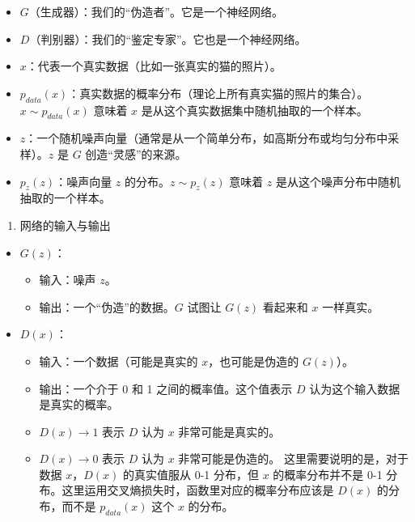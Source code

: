 \begin{itemize}
\tightlist
\item
  \(G\)（生成器）：我们的``伪造者''。它是一个神经网络。
\item
  \(D\)（判别器）：我们的``鉴定专家''。它也是一个神经网络。
\item
  \(x\)：代表一个真实数据（比如一张真实的猫的照片）。
\item
  \(p_{data}(x)\)：真实数据的概率分布（理论上所有真实猫的照片的集合）。\(x \sim p_{data}(x)\) 意味着 \(x\) 是从这个真实数据集中随机抽取的一个样本。
\item
  \(z\)：一个随机噪声向量（通常是从一个简单分布，如高斯分布或均匀分布中采样）。\(z\) 是 \(G\) 创造``灵感''的来源。
\item
  \(p_z(z)\)：噪声向量 \(z\) 的分布。\(z \sim p_z(z)\) 意味着 \(z\) 是从这个噪声分布中随机抽取的一个样本。
\end{itemize}

\begin{enumerate}
\def\labelenumi{\arabic{enumi}.}
\setcounter{enumi}{1}
\tightlist
\item
  网络的输入与输出
\end{enumerate}

\begin{itemize}
\tightlist
\item
  \(G(z)\)：

  \begin{itemize}
  \tightlist
  \item
    输入：噪声 \(z\)。
  \item
    输出：一个``伪造''的数据。\(G\) 试图让 \(G(z)\) 看起来和 \(x\) 一样真实。
  \end{itemize}
\item
  \(D(x)\)：

  \begin{itemize}
  \tightlist
  \item
    输入：一个数据（可能是真实的 \(x\)，也可能是伪造的 \(G(z)\)）。
  \item
    输出：一个介于 0 和 1 之间的概率值。这个值表示 \(D\) 认为这个输入数据是真实的概率。
  \item
    \(D(x)\to 1\) 表示 \(D\) 认为 \(x\) 非常可能是真实的。
  \item
    \(D(x)\to 0\) 表示 \(D\) 认为 \(x\) 非常可能是伪造的。
    这里需要说明的是，对于数据 \(x\)，\(D(x)\) 的真实值服从 0-1 分布，但 \(x\) 的概率分布并不是 0-1 分布。这里运用交叉熵损失时，函数里对应的概率分布应该是 \(D(x)\) 的分布，而不是 \(p_{data}(x)\) 这个 \(x\) 的分布。
  \end{itemize}
\end{itemize}

